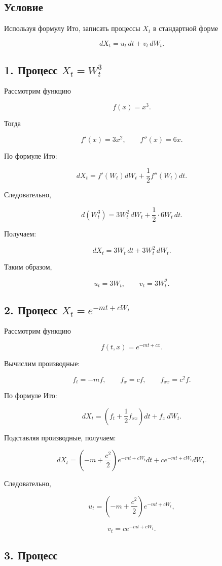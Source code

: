 \subsection*{Условие}

Используя формулу Ито, записать процессы \(X_t\) в стандартной форме

\[
dX_t = u_t\,dt + v_t\,dW_t.
\]

\subsection*{1. Процесс \(X_t = W_t^3\)}

Рассмотрим функцию

\[
f(x)=x^3.
\]

Тогда

\[
f'(x)=3x^2,
\qquad
f''(x)=6x.
\]

По формуле Ито:

\[
dX_t = f'(W_t)dW_t + \frac12 f''(W_t)dt.
\]

Следовательно,

\[
d(W_t^3)=3W_t^2\,dW_t+\frac12\cdot 6W_t\,dt.
\]

Получаем:

\[
dX_t = 3W_t\,dt + 3W_t^2\,dW_t.
\]

Таким образом,

\[
u_t = 3W_t,
\qquad
v_t = 3W_t^2.
\]

\subsection*{2. Процесс \(X_t = e^{-mt+cW_t}\)}

Рассмотрим функцию

\[
f(t,x)=e^{-mt+cx}.
\]

Вычислим производные:

\[
f_t=-mf,
\qquad
f_x=cf,
\qquad
f_{xx}=c^2f.
\]

По формуле Ито:

\[
dX_t =
\left(
f_t+\frac12 f_{xx}
\right)dt
+
f_x\,dW_t.
\]

Подставляя производные, получаем:

\[
dX_t =
\left(
-m+\frac{c^2}{2}
\right)e^{-mt+cW_t}dt
+
ce^{-mt+cW_t}dW_t.
\]

Следовательно,

\[
u_t=
\left(
-m+\frac{c^2}{2}
\right)e^{-mt+cW_t},
\]

\[
v_t=
ce^{-mt+cW_t}.
\]

\subsection*{3. Процесс}

